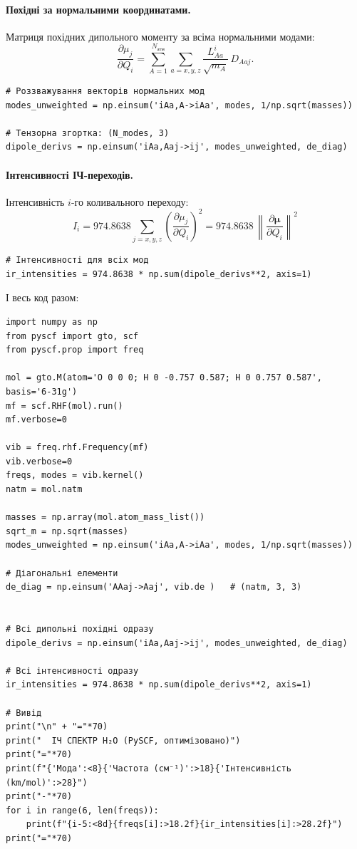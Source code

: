 \paragraph{Похідні за нормальними координатами.}
Матриця похідних дипольного моменту за всіма нормальними модами:
\begin{equation*}
    \frac{\partial \mu_j}{\partial Q_i}
    = \sum_{A=1}^{N_{\text{атм}}} \sum_{a=x,y,z} \frac{L_{Aa}^i}{\sqrt{m_A}} \, D_{Aaj}.
\end{equation*}

\begin{verbatim}
# Роззважування векторів нормальних мод
modes_unweighted = np.einsum('iAa,A->iAa', modes, 1/np.sqrt(masses))

# Тензорна згортка: (N_modes, 3)
dipole_derivs = np.einsum('iAa,Aaj->ij', modes_unweighted, de_diag)
\end{verbatim}

\paragraph{Інтенсивності ІЧ-переходів.}
Інтенсивність $i$-го коливального переходу:
\begin{equation*}
    I_i = 974.8638 \sum_{j=x,y,z} \left( \frac{\partial \mu_j}{\partial Q_i} \right)^2
    = 974.8638 \, \left\| \frac{\partial \boldsymbol{\mu}}{\partial Q_i} \right\|^2
\end{equation*}

\begin{verbatim}
# Інтенсивності для всіх мод
ir_intensities = 974.8638 * np.sum(dipole_derivs**2, axis=1)
\end{verbatim}

І весь код разом:

\begin{verbatim}
import numpy as np
from pyscf import gto, scf
from pyscf.prop import freq

mol = gto.M(atom='O 0 0 0; H 0 -0.757 0.587; H 0 0.757 0.587', basis='6-31g')
mf = scf.RHF(mol).run()
mf.verbose=0

vib = freq.rhf.Frequency(mf)
vib.verbose=0
freqs, modes = vib.kernel()
natm = mol.natm

masses = np.array(mol.atom_mass_list())
sqrt_m = np.sqrt(masses)
modes_unweighted = np.einsum('iAa,A->iAa', modes, 1/np.sqrt(masses))

# Діагональні елементи
de_diag = np.einsum('AAaj->Aaj', vib.de )   # (natm, 3, 3)


# Всі дипольні похідні одразу
dipole_derivs = np.einsum('iAa,Aaj->ij', modes_unweighted, de_diag)

# Всі інтенсивності одразу
ir_intensities = 974.8638 * np.sum(dipole_derivs**2, axis=1)

# Вивід
print("\n" + "="*70)
print("  ІЧ СПЕКТР H₂O (PySCF, оптимізовано)")
print("="*70)
print(f"{'Мода':<8}{'Частота (см⁻¹)':>18}{'Інтенсивність (km/mol)':>28}")
print("-"*70)
for i in range(6, len(freqs)):
    print(f"{i-5:<8d}{freqs[i]:>18.2f}{ir_intensities[i]:>28.2f}")
print("="*70)
\end{verbatim}

